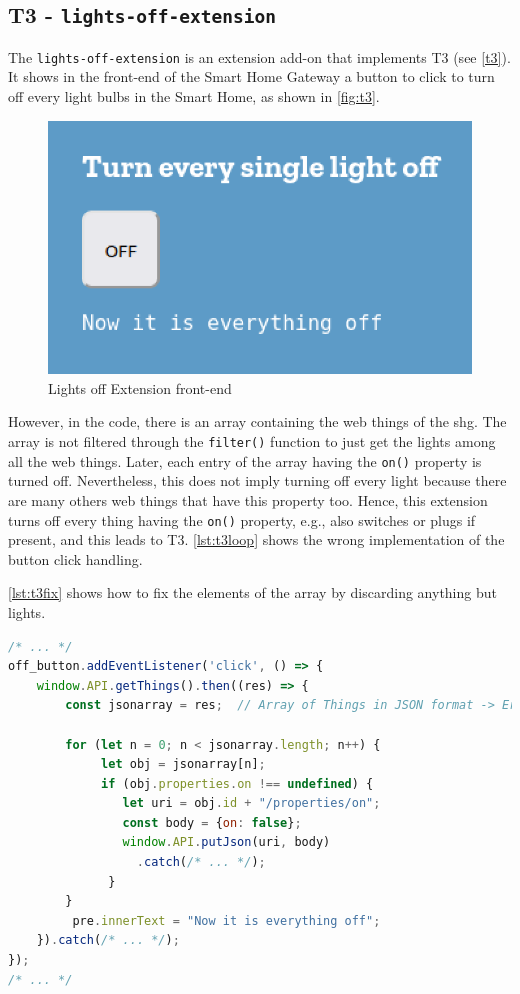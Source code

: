 \subsection{T3 - \texttt{lights-off-extension}}
\label{t3poc}

The \texttt{lights-off-extension} is an extension add-on that implements T3 (see \autoref{t3}). It shows in the front-end of the Smart Home Gateway a button to click to turn off every light bulbs in the Smart Home, as shown in \autoref{fig:t3}.

\begin{figure}[H]
    \centering
    \includegraphics[scale=0.75]{images/addons/lights-off.png}
    \caption{Lights off Extension front-end}
    \label{fig:t3}
\end{figure}


However, in the code, there is an array containing the \glspl{web thing} of the \gls{shg}. The array is not filtered through the \texttt{filter()} function to just get the lights among all the \glspl{web thing}. Later, each entry of the array having the \texttt{on()} property is turned off. Nevertheless, this does not imply turning off every light because there are many others \glspl{web thing} that have this property too. Hence, this extension turns off every thing having the \texttt{on()} property, e.g., also switches or plugs if present, and this leads to T3. \autoref{lst:t3loop} shows the wrong implementation of the button click handling.

\autoref{lst:t3fix} shows how to fix the elements of the array by discarding anything but lights.

\begin{lstlisting}[language=JavaScript, label=lst:t3loop, caption=T3 - Loop in charge of turning light bulbs off]
/* ... */
off_button.addEventListener('click', () => {
    window.API.getThings().then((res) => {
        const jsonarray = res;  // Array of Things in JSON format -> Error: should be filtered
  
        for (let n = 0; n < jsonarray.length; n++) {
             let obj = jsonarray[n];
             if (obj.properties.on !== undefined) {
                let uri = obj.id + "/properties/on";
                const body = {on: false};
                window.API.putJson(uri, body)
                  .catch(/* ... */);      
              }
        }
         pre.innerText = "Now it is everything off";
    }).catch(/* ... */);
});
/* ... */    
\end{lstlisting}

